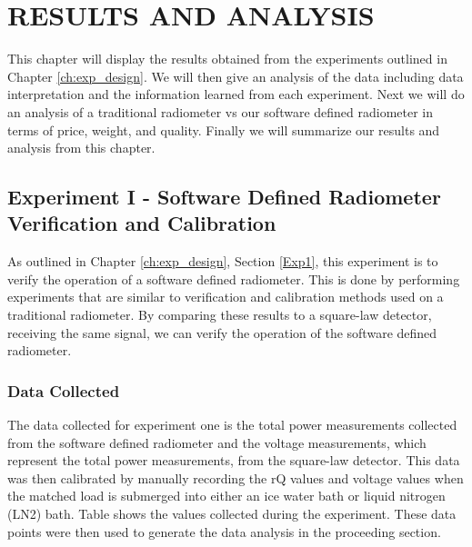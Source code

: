 


\chapter{RESULTS AND ANALYSIS}\label{ch:results}
This chapter will display the results obtained from the experiments outlined in Chapter \ref{ch:exp_design}.  We will then give an analysis of the data including data interpretation and the information learned from each experiment.  Next we will do an analysis of a traditional radiometer vs our software defined radiometer in terms of price, weight, and quality.  Finally we will summarize our results and analysis from this chapter.

\section{Experiment I - Software Defined Radiometer Verification and Calibration} \label{Exp1_results}
As outlined in Chapter \ref{ch:exp_design}, Section \ref{Exp1}, this experiment is to verify the operation of a software defined radiometer.  This is done by performing experiments that are similar to verification and calibration methods used on a traditional radiometer.  By comparing these results to a square-law detector, receiving the same signal, we can verify the operation of the software defined radiometer.

\subsection{Data Collected}

The data collected for experiment one is the total power measurements collected from the software defined radiometer and the voltage measurements, which represent the total power measurements, from the square-law detector.  This data was then calibrated by manually recording the rQ values and voltage values when the matched load is submerged into either an ice water bath or liquid nitrogen (LN2) bath.  Table shows the values collected during the experiment.  These data points were then used to generate the data analysis in the proceeding section.

